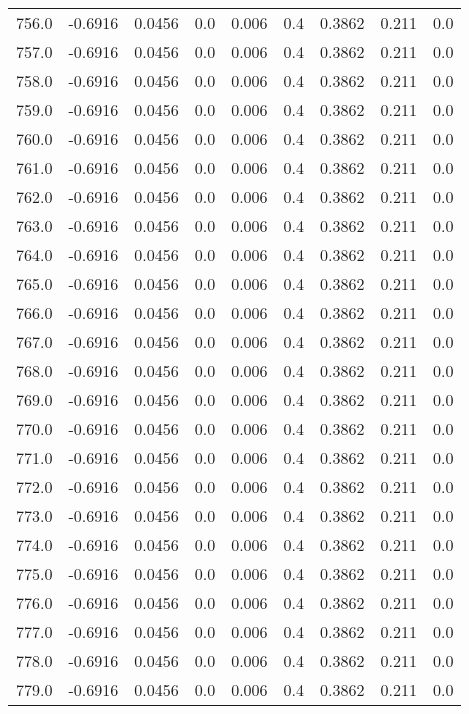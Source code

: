 \begin{longtable}{lrrrrrrrr}
756.0 & -0.6916 & 0.0456 & 0.0 & 0.006 & 0.4 & 0.3862 & 0.211 & 0.0 \\
757.0 & -0.6916 & 0.0456 & 0.0 & 0.006 & 0.4 & 0.3862 & 0.211 & 0.0 \\
758.0 & -0.6916 & 0.0456 & 0.0 & 0.006 & 0.4 & 0.3862 & 0.211 & 0.0 \\
759.0 & -0.6916 & 0.0456 & 0.0 & 0.006 & 0.4 & 0.3862 & 0.211 & 0.0 \\
760.0 & -0.6916 & 0.0456 & 0.0 & 0.006 & 0.4 & 0.3862 & 0.211 & 0.0 \\
761.0 & -0.6916 & 0.0456 & 0.0 & 0.006 & 0.4 & 0.3862 & 0.211 & 0.0 \\
762.0 & -0.6916 & 0.0456 & 0.0 & 0.006 & 0.4 & 0.3862 & 0.211 & 0.0 \\
763.0 & -0.6916 & 0.0456 & 0.0 & 0.006 & 0.4 & 0.3862 & 0.211 & 0.0 \\
764.0 & -0.6916 & 0.0456 & 0.0 & 0.006 & 0.4 & 0.3862 & 0.211 & 0.0 \\
765.0 & -0.6916 & 0.0456 & 0.0 & 0.006 & 0.4 & 0.3862 & 0.211 & 0.0 \\
766.0 & -0.6916 & 0.0456 & 0.0 & 0.006 & 0.4 & 0.3862 & 0.211 & 0.0 \\
767.0 & -0.6916 & 0.0456 & 0.0 & 0.006 & 0.4 & 0.3862 & 0.211 & 0.0 \\
768.0 & -0.6916 & 0.0456 & 0.0 & 0.006 & 0.4 & 0.3862 & 0.211 & 0.0 \\
769.0 & -0.6916 & 0.0456 & 0.0 & 0.006 & 0.4 & 0.3862 & 0.211 & 0.0 \\
770.0 & -0.6916 & 0.0456 & 0.0 & 0.006 & 0.4 & 0.3862 & 0.211 & 0.0 \\
771.0 & -0.6916 & 0.0456 & 0.0 & 0.006 & 0.4 & 0.3862 & 0.211 & 0.0 \\
772.0 & -0.6916 & 0.0456 & 0.0 & 0.006 & 0.4 & 0.3862 & 0.211 & 0.0 \\
773.0 & -0.6916 & 0.0456 & 0.0 & 0.006 & 0.4 & 0.3862 & 0.211 & 0.0 \\
774.0 & -0.6916 & 0.0456 & 0.0 & 0.006 & 0.4 & 0.3862 & 0.211 & 0.0 \\
775.0 & -0.6916 & 0.0456 & 0.0 & 0.006 & 0.4 & 0.3862 & 0.211 & 0.0 \\
776.0 & -0.6916 & 0.0456 & 0.0 & 0.006 & 0.4 & 0.3862 & 0.211 & 0.0 \\
777.0 & -0.6916 & 0.0456 & 0.0 & 0.006 & 0.4 & 0.3862 & 0.211 & 0.0 \\
778.0 & -0.6916 & 0.0456 & 0.0 & 0.006 & 0.4 & 0.3862 & 0.211 & 0.0 \\
779.0 & -0.6916 & 0.0456 & 0.0 & 0.006 & 0.4 & 0.3862 & 0.211 & 0.0 \\

\end{longtable}
